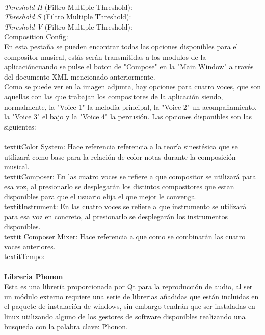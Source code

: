\\\textit{Threshold H} (Filtro Multiple Threshold):
\\\textit{Threshold S} (Filtro Multiple Threshold):
\\\textit{Threshold V} (Filtro Multiple Threshold):
\newline
\\\underline{Composition Config:}
\\En esta pestaña se pueden encontrar todas las opciones disponibles para el compositor musical, estás serán transmitidas a los modulos de la aplicacióncuando se pulse el boton de "Compose" en la "Main Window" a través del documento XML mencionado anteriormente.
\\Como se puede ver en la imagen adjunta, hay opciones para cuatro voces, que son aquellas con las que trabajan los compositores de la aplicación siendo, normalmente, la "Voice 1" la melodía principal, la "Voice 2" un acompañamiento, la "Voice 3" el bajo y la "Voice 4" la percusión. Las opciones disponibles son las siguientes:
\\
\newline
\\textit{Color System:} Hace referencia referencia a la teoría sinestésica que se utilizará como base para la relación de color-notas durante la composición musical.
\\textit{Composer:} En las cuatro voces se refiere a que compositor se utilizará para esa voz, al presionarlo se desplegarán los distintos compositores que estan disponibles para que el usuario elija el que mejor le convenga.
\\textit{Instrument:} En las cuatro voces se refiere a que instrumento se utilizará para esa voz en concreto, al presionarlo se desplegarán los instrumentos disponibles.
\\textit {Composer Mixer:} Hace referencia a que como se combinarán las cuatro voces anteriores.
\\textit{Tempo:} 
\\
\newline
\\{\bf Libreria Phonon}
\\Esta es una librería proporcionada por Qt para la reproducción de audio, al ser un módulo externo requiere una serie de librerias añadidas que están incluidas en el paquete de instalación de windows, sin embargo tendrán que ser instaladas en linux utilizando alguno de los gestores de software disponibles realizando una busqueda con la palabra clave: Phonon.
